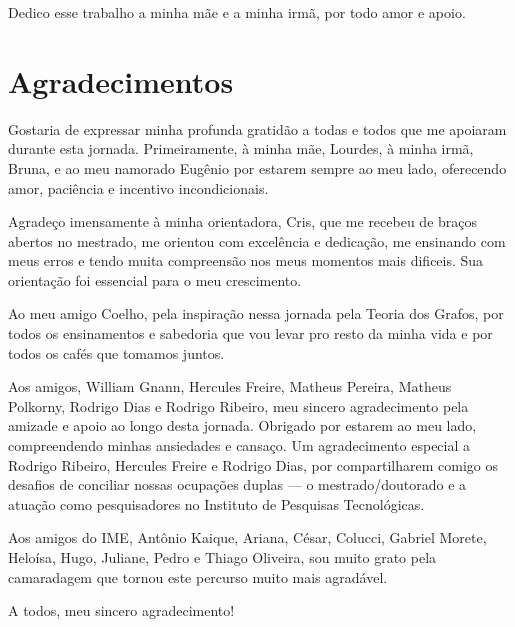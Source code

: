 
\begin{dedicatoria}
Dedico esse trabalho a minha mãe e a minha irmã, por todo amor e apoio.
\end{dedicatoria}


\chapter*{Agradecimentos}
Gostaria de expressar minha profunda gratidão a todas e todos que me apoiaram durante esta jornada.
Primeiramente, à minha mãe, Lourdes, à minha irmã, Bruna, e ao meu namorado Eugênio por estarem sempre ao meu lado, oferecendo amor, paciência e incentivo incondicionais.

Agradeço imensamente à minha orientadora, Cris, que me recebeu de braços abertos no mestrado, me orientou com excelência e dedicação, me ensinando com meus erros e tendo muita compreensão nos meus momentos mais dificeis.
Sua orientação foi essencial para o meu crescimento.

Ao meu amigo Coelho, pela inspiração nessa jornada pela Teoria dos Grafos, por todos os ensinamentos e sabedoria que vou levar pro resto da minha vida e por todos os cafés que tomamos juntos.

Aos amigos, William Gnann, Hercules Freire, Matheus Pereira, Matheus Polkorny, Rodrigo Dias e Rodrigo Ribeiro, meu sincero agradecimento pela amizade e apoio ao longo desta jornada.
Obrigado por estarem ao meu lado, compreendendo minhas ansiedades e cansaço.
Um agradecimento especial a Rodrigo Ribeiro, Hercules Freire e Rodrigo Dias, por compartilharem comigo os desafios de conciliar nossas ocupações duplas — o mestrado/doutorado e a atuação como pesquisadores no Instituto de Pesquisas Tecnológicas.

Aos amigos do IME, Antônio Kaique, Ariana, César, Colucci, Gabriel Morete, Heloísa, Hugo, Juliane, Pedro e Thiago Oliveira, sou muito grato pela camaradagem que tornou este percurso muito mais agradável.

A todos, meu sincero agradecimento!

